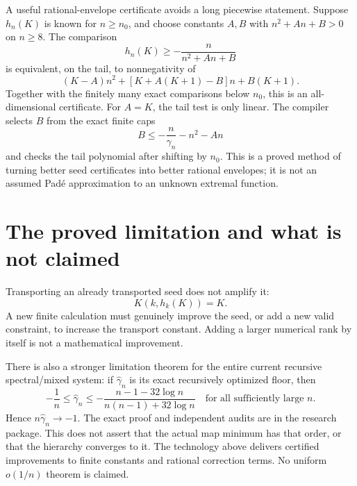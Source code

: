 \documentclass[11pt]{article}
\begin{document}
A useful rational-envelope certificate avoids a long piecewise statement.
Suppose $h_n(K)$ is known for $n\ge n_0$, and choose constants $A,B$ with
$n^2+An+B>0$ on $n\ge8$. The comparison
\[
 h_n(K)\ge-\frac{n}{n^2+An+B}
\]
is equivalent, on the tail, to nonnegativity of
\[
 (K-A)n^2+[K+A(K+1)-B]n+B(K+1).
\]
Together with the finitely many exact comparisons below $n_0$, this is an
all-dimensional certificate. For $A=K$, the tail test is only linear.
The compiler selects $B$ from the exact finite caps
\[
 B\le-\frac{n}{\gamma_n}-n^2-An
\]
and checks the tail polynomial after shifting by $n_0$. This is a proved
method of turning better seed certificates into better rational envelopes;
it is not an assumed Pad\'e approximation to an unknown extremal function.

\section{The proved limitation and what is not claimed}
Transporting an already transported seed does not amplify it:
\[
 K(k,h_k(K))=K.
\]
A new finite calculation must genuinely improve the seed, or add a new valid
constraint, to increase the transport constant. Adding a larger numerical
rank by itself is not a mathematical improvement.

There is also a stronger limitation theorem for the entire current recursive
spectral/mixed system: if $\widehat\gamma_n$ is its exact recursively optimized
floor, then
\[
 -\frac1n\le\widehat\gamma_n\le
 -\frac{n-1-32\log n}{n(n-1)+32\log n}
 \quad\text{for all sufficiently large }n.
\]
Hence $n\widehat\gamma_n\to-1$. The exact proof and independent audits are in
the research package. This does not assert that the actual map minimum has
that order, or that the hierarchy converges to it. The technology above
delivers certified improvements to finite constants and rational correction
terms. No uniform $o(1/n)$ theorem is claimed.
\end{document}

